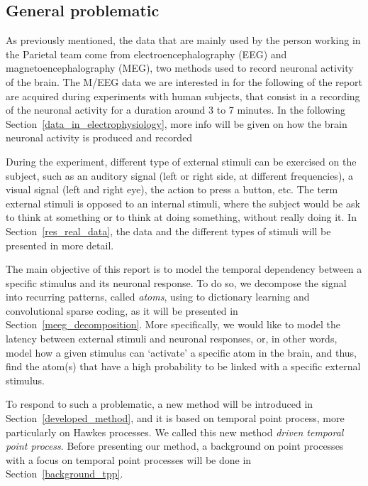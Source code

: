 \subsection{General problematic}

As previously mentioned, the data that are mainly used by the person working in the Parietal team come from electroencephalography (EEG) and magnetoencephalography (MEG), two methods used to record neuronal activity of the brain.
The M/EEG data we are interested in for the following of the report are acquired during experiments with human subjects, that consist in a recording of the neuronal activity for a duration around 3 to 7 minutes.
In the following Section~\ref{data_in_electrophysiology}, more info will be given on how the brain neuronal activity is produced and recorded

During the experiment, different type of external stimuli can be exercised on the subject, such as an auditory signal (left or right side, at different frequencies), a visual signal (left and right eye), the action to press a button, etc.
The term external stimuli is opposed to an internal stimuli, where the subject would be ask to think at something or to think at doing something, without really doing it.
In Section~\ref{res_real_data}, the data and the different types of stimuli will be presented in more detail.

The main objective of this report is to model the temporal dependency between a specific stimulus and its neuronal response.
To do so, we decompose the signal into recurring patterns, called \textit{atoms}, using to dictionary learning and convolutional sparse coding, as it will be presented in Section~\ref{meeg_decomposition}.
More specifically, we would like to model the latency between external stimuli and neuronal responses, or, in other words, model how a given stimulus can `activate' a specific atom in the brain, and thus, find the atom(s) that have a high probability to be linked with a specific external stimulus.

To respond to such a problematic, a new method will be introduced in Section~\ref{developed_method}, and it is based on temporal point process, more particularly on Hawkes processes.
We called this new method \textit{driven temporal point process}.
Before presenting our method, a background on point processes with a focus on temporal point processes will  be done  in Section~\ref{background_tpp}.

 